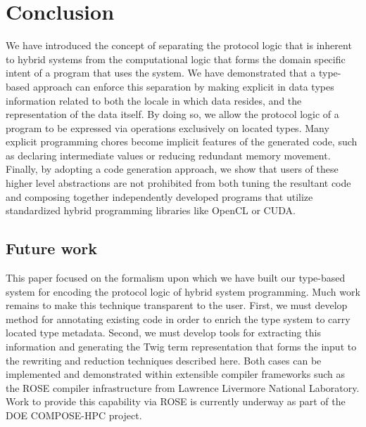 
\section{Conclusion}

We have introduced the concept of separating the protocol logic that is inherent
to hybrid systems from the computational logic that forms the domain specific
intent of a program that uses the system. We have demonstrated that a type-based
approach can enforce this separation by making explicit in data types
information related to both the locale in which data resides, and the
representation of the data itself. By doing so, we allow the protocol logic of a
program to be expressed via operations exclusively on located types. Many
explicit programming chores become implicit features of the generated code, such
as declaring intermediate values or reducing redundant memory movement. Finally,
by adopting a code generation approach, we show that users of these higher level
abstractions are not prohibited from both tuning the resultant code and
composing together independently developed programs that utilize standardized
hybrid programming libraries like OpenCL or CUDA.

\subsection{Future work}

This paper focused on the formalism upon which we have built our type-based
system for encoding the protocol logic of hybrid system programming. Much work
remains to make this technique transparent to the user. First, we must develop
method for annotating existing code in order to enrich the type system to carry
located type metadata. Second, we must develop tools for extracting this
information and generating the Twig term representation that forms the input to
the rewriting and reduction techniques described here. Both cases can be
implemented and demonstrated within extensible compiler frameworks such as the
ROSE compiler infrastructure from Lawrence Livermore National Laboratory. Work
to provide this capability via ROSE is currently underway as part of the DOE
COMPOSE-HPC project.
